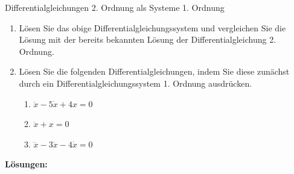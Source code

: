 \clearpage
\begin{ueb}{Differentialgleichungen 2. Ordnung als Systeme 1. Ordnung}{}
    \begin{enumerate}
        \item Lösen Sie das obige Differentialgleichungssystem und
              vergleichen Sie die Lösung mit der bereits bekannten
              Lösung der Differentialgleichung 2. Ordnung.

        \item Lösen Sie die folgenden Differentialgleichungen,
              indem Sie diese zunächst durch ein
              Differentialgleichungssystem 1. Ordnung ausdrücken.

              \begin{enumerate}
                  \item \(\ddot{x}-5\dot{x}+4x=0\)
                  \item \(\ddot{x}+x=0\)
                  \item \(\dddot{x}-3\ddot{x}-4\dot{x}=0\)
              \end{enumerate}
    \end{enumerate}
\end{ueb}

\clearpage
\textbf{Lösungen:}

